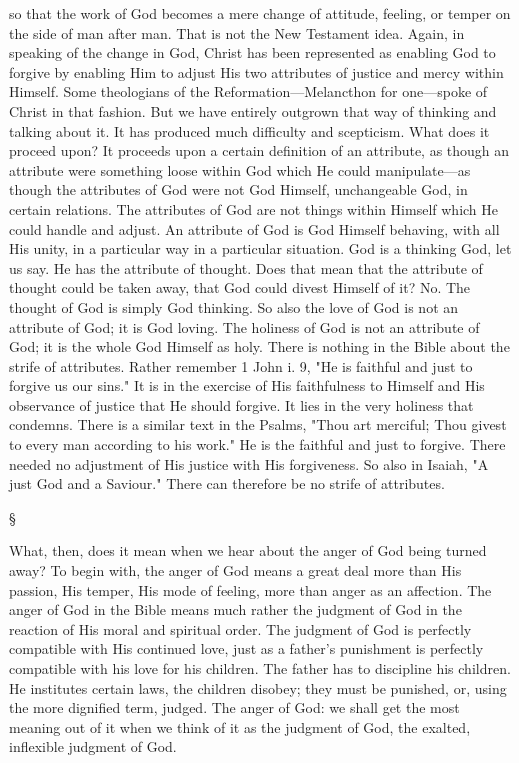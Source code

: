 \documentclass[12pt,letterpaper,oneside]{book}
\begin{document}
so that the work of God becomes a mere change 
of attitude, feeling, or temper on the side of man 
after man. That is not the New Testament idea. 
Again, in speaking of the change in God, Christ 
has been represented as enabling God to forgive 
by enabling Him to adjust His two attributes of 
justice and mercy within Himself. Some theologians 
of the Reformation---Melancthon for one---spoke 
of Christ in that fashion. But we have 
entirely outgrown that way of thinking and 
talking about it. It has produced much difficulty 
and scepticism. What does it proceed 
upon? It proceeds upon a certain definition 
of an attribute, as though an attribute were 
something loose within God which He could 
manipulate---as though the attributes of God 
were not God Himself, unchangeable God, in 
certain relations. The attributes of God are 
not things within Himself which He could 
handle and adjust. An attribute of God is God 
Himself behaving, with all His unity, in a particular 
way in a particular situation. God is 
a thinking God, let us say. He has the attribute 
of thought. Does that mean that the 
attribute of thought could be taken away, 
that God could divest Himself of it? No. The 
thought of God is simply God thinking. So 
also the love of God is not an attribute of 
God; it is God loving. The holiness of God 
is not an attribute of God; it is the whole 
God Himself as holy. There is nothing in the 
Bible about the strife of attributes. Rather 
remember 1 John i. 9, "He is faithful and just 
to forgive us our sins." It is in the exercise of 
His faithfulness to Himself and His observance 
of justice that He should forgive. It lies in 
the very holiness that condemns. There is a 
similar text in the Psalms, "Thou art merciful; 
Thou givest to every man according to his 
work." He is the faithful and just to forgive. 
There needed no adjustment of His justice with 
His forgiveness. So also in Isaiah, "A just God 
and a Saviour." There can therefore be no strife 
of attributes. 

\begin{center}
\S
\end{center}

What, then, does it mean when we hear about 
the anger of God being turned away? To begin 
with, the anger of God means a great deal more 
than His passion, His temper, His mode of 
feeling, more than anger as an affection. The 
anger of God in the Bible means much rather 
the judgment of God in the reaction of His 
moral and spiritual order. The judgment of God 
is perfectly compatible with His continued love, 
just as a father's punishment is perfectly compatible 
with his love for his children. The 
father has to discipline his children. He institutes 
certain laws, the children disobey; they 
must be punished, or, using the more dignified 
term, judged. The anger of God: we shall get 
the most meaning out of it when we think of it 
as the judgment of God, the exalted, inflexible 
judgment of God. 
\end{document}
